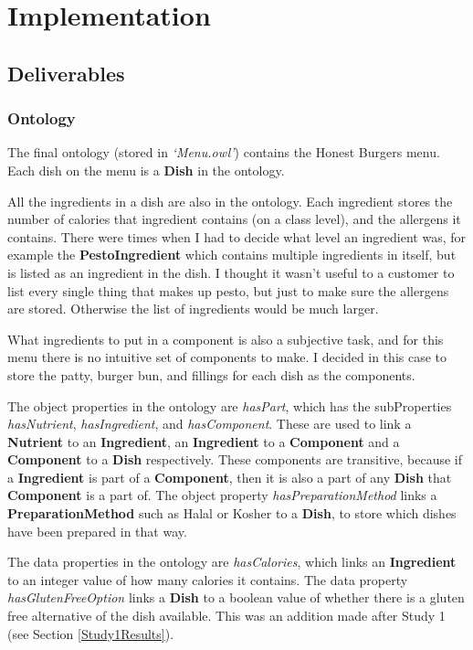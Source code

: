 \chapter{Implementation}

\section{Deliverables}

\subsection{Ontology}

The final ontology (stored in \textit{`Menu.owl'}) contains the Honest Burgers \cite{honest_burgers_2023} menu. Each dish on the menu is a \textbf{Dish} in the ontology.

All the ingredients in a dish are also in the ontology. Each ingredient stores the number of calories that ingredient contains (on a class level), and the allergens it contains. There were times when I had to decide what level an ingredient was, for example the \textbf{PestoIngredient} which contains multiple ingredients in itself, but is listed as an ingredient in the dish. I thought it wasn't useful to a customer to list every single thing that makes up pesto, but just to make sure the allergens are stored. Otherwise the list of ingredients would be much larger.

What ingredients to put in a component is also a subjective task, and for this menu there is no intuitive set of components to make. I decided in this case to store the patty, burger bun, and fillings for each dish as the components.

The object properties in the ontology are \textit{hasPart}, which has the subProperties \textit{hasNutrient}, \textit{hasIngredient}, and \textit{hasComponent}. These are used to link a \textbf{Nutrient} to an \textbf{Ingredient}, an \textbf{Ingredient} to a \textbf{Component} and a \textbf{Component} to a \textbf{Dish} respectively. These components are transitive, because if a \textbf{Ingredient} is part of a \textbf{Component}, then it is also a part of any \textbf{Dish} that \textbf{Component} is a part of. The object property \textit{hasPreparationMethod} links a \textbf{PreparationMethod} such as Halal or Kosher to a \textbf{Dish}, to store which dishes have been prepared in that way.

The data properties in the ontology are \textit{hasCalories}, which links an \textbf{Ingredient} to an integer value of how many calories it contains. The data property \textit{hasGlutenFreeOption} links a \textbf{Dish} to a boolean value of whether there is a gluten free alternative of the dish available. This was an addition made after Study 1 (see Section \ref{Study1Results}).

